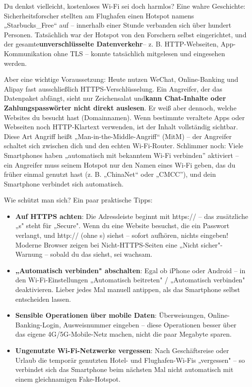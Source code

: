 
Du denkst vielleicht, kostenloses Wi-Fi sei doch harmlos? Eine wahre Geschichte: Sicherheitsforscher stellten am Flughafen einen Hotspot namens „Starbucks\_Free“ auf – innerhalb einer Stunde verbanden sich über hundert Personen. Tatsächlich war der Hotspot von den Forschern selbst eingerichtet, und der gesamte\textbf{unverschlüsselte Datenverkehr}– z. B. HTTP-Webseiten, App-Kommunikation ohne TLS – konnte tatsächlich mitgelesen und eingesehen werden.

Aber eine wichtige Voraussetzung: Heute nutzen WeChat, Online-Banking und Alipay fast ausschließlich HTTPS-Verschlüsselung. Ein Angreifer, der das Datenpaket abfängt, sieht nur Zeichensalat und\textbf{kann Chat-Inhalte oder Zahlungspasswörter nicht direkt auslesen}. Er weiß aber dennoch, welche Websites du besucht hast (Domainnamen). Wenn bestimmte veraltete Apps oder Webseiten noch HTTP-Klartext verwenden, ist der Inhalt vollständig sichtbar. Diese Art Angriff heißt „Man-in-the-Middle-Angriff“ (MitM) – der Angreifer schaltet sich zwischen dich und den echten Wi-Fi-Router. Schlimmer noch: Viele Smartphones haben „automatisch mit bekanntem Wi-Fi verbinden” aktiviert – ein Angreifer muss seinem Hotspot nur den Namen eines Wi-Fi geben, das du früher einmal genutzt hast (z. B. „ChinaNet“ oder „CMCC”), und dein Smartphone verbindet sich automatisch.

Wie schützt man sich? Ein paar praktische Tipps:

\begin{itemize}
  \item \textbf{Auf HTTPS achten}: Die Adressleiste beginnt mit https:// – das zusätzliche „s" steht für „Secure". Wenn du eine Website besuchst, die ein Passwort verlangt, und http:// (ohne s) siehst – sofort aufhören, nichts eingeben! Moderne Browser zeigen bei Nicht-HTTPS-Seiten eine „Nicht sicher"-Warnung – sobald du das siehst, sei wachsam.
  \item \textbf{„Automatisch verbinden" abschalten}: Egal ob iPhone oder Android – in den Wi-Fi-Einstellungen „Automatisch beitreten" / „Automatisch verbinden" deaktivieren. Lieber jedes Mal manuell antippen, als das Smartphone selbst entscheiden lassen.
  \item \textbf{Sensible Operationen über mobile Daten}: Überweisungen, Online-Banking-Login, Ausweisnummer eingeben – diese Operationen besser über das eigene 4G/5G-Mobile-Netz machen, nicht die paar Megabyte sparen.
  \item \textbf{Ungenutzte Wi-Fi-Netzwerke vergessen}: Nach Geschäftsreise oder Urlaub die temporär genutzten Hotel- und Flughafen-Wi-Fis „vergessen" – so verbindet sich das Smartphone beim nächsten Mal nicht automatisch mit einem gleichnamigen Fake-Hotspot.
\end{itemize}

